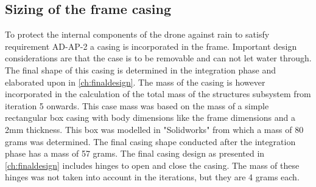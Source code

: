 \subsection{Sizing of the frame casing}
To protect the internal components of the drone against rain to satisfy requirement AD-AP-2 a casing is incorporated in the frame. Important design considerations are that the case is to be removable and can not let water through. The final shape of this casing is determined in the integration phase and elaborated upon in \autoref{ch:finaldesign}. The mass of the casing is however incorporated in the calculation of the total mass of the structures subsystem from iteration 5 onwards. This case mass was based on the mass of a simple rectangular box casing with body dimensions like the frame dimensions and a 2mm thickness. This box was modelled in "Solidworks" from which a mass of 80 grams was determined. The final casing shape conducted after the integration phase has a mass of 57 grams. The final casing design as presented in \autoref{ch:finaldesign} includes hinges to open and close the casing. The mass of these hinges was not taken into account in the iterations, but they are 4 grams each.  


